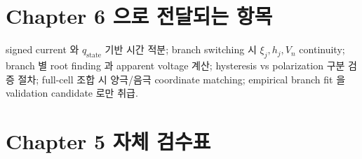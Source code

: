 \documentclass[11pt,a4paper]{article}
\newcommand{\stt}{\mathrm{state}}
\begin{document}
\section{Chapter 6 으로 전달되는 항목}\label{sec:ch5_transmit}
signed current 와 $q_\stt$ 기반 시간 적분; branch switching 시 $\xi_j,h_j,V_n$ continuity; branch 별 root
finding 과 apparent voltage 계산; hysteresis vs polarization 구분 검증 절차; full-cell 조합 시 양극/음극
coordinate matching; empirical branch fit 을 validation candidate 로만 취급.

\section{Chapter 5 자체 검수표}\label{sec:ch5_selfcheck}
\end{document}
